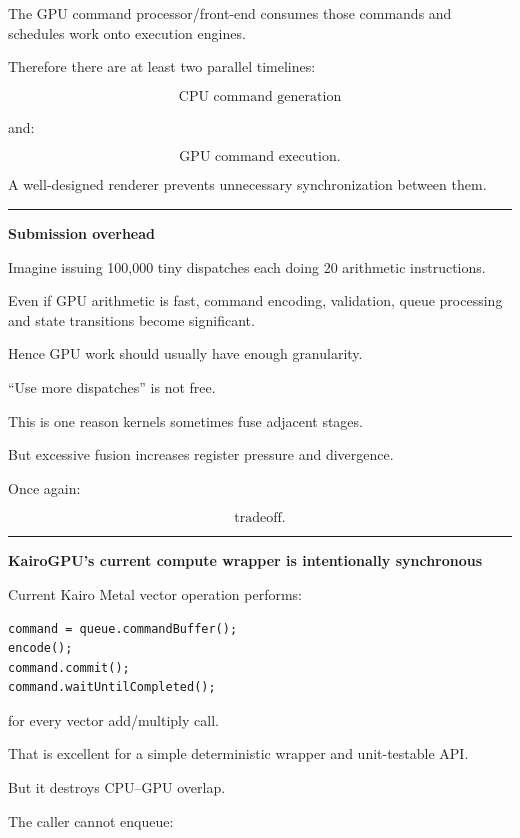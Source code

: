 The GPU command processor/front-end consumes those commands and schedules work onto execution engines.

Therefore there are at least two parallel timelines:

\[
\boxed{
\text{CPU command generation}
}
\]

and:

\[
\boxed{
\text{GPU command execution}.
}
\]

A well-designed renderer prevents unnecessary synchronization between them.

\begin{center}\rule{0.5\linewidth}{0.5pt}\end{center}

\textbf{Submission overhead}

Imagine issuing 100,000 tiny dispatches each doing 20 arithmetic instructions.

Even if GPU arithmetic is fast, command encoding, validation, queue processing and state transitions become significant.

Hence GPU work should usually have enough granularity.

``Use more dispatches'' is not free.

This is one reason kernels sometimes fuse adjacent stages.

But excessive fusion increases register pressure and divergence.

Once again:

\[
\boxed{\text{tradeoff}.}
\]

\begin{center}\rule{0.5\linewidth}{0.5pt}\end{center}

\textbf{KairoGPU's current compute wrapper is intentionally synchronous}

Current Kairo Metal vector operation performs:

\protect{}\label{p10-kairo-sync}%
\begin{verbatim}
command = queue.commandBuffer();
encode();
command.commit();
command.waitUntilCompleted();
\end{verbatim}

for every vector add/multiply call.

That is excellent for a simple deterministic wrapper and unit-testable API.

But it destroys CPU--GPU overlap.

The caller cannot enqueue:

